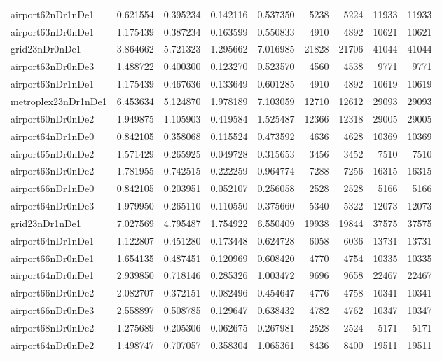 \begin{longtable}{|l|r|r|r|r|r|r|r|r|}
airport62nDr1nDe1 & 0.621554 & 0.395234 & 0.142116 & 0.537350 & 5238 & 5224 & 11933 & 11933 \\
airport63nDr0nDe1 & 1.175439 & 0.387234 & 0.163599 & 0.550833 & 4910 & 4892 & 10621 & 10621 \\
grid23nDr0nDe1 & 3.864662 & 5.721323 & 1.295662 & 7.016985 & 21828 & 21706 & 41044 & 41044 \\
airport63nDr0nDe3 & 1.488722 & 0.400300 & 0.123270 & 0.523570 & 4560 & 4538 & 9771 & 9771 \\
airport63nDr1nDe1 & 1.175439 & 0.467636 & 0.133649 & 0.601285 & 4910 & 4892 & 10619 & 10619 \\
metroplex23nDr1nDe1 & 6.453634 & 5.124870 & 1.978189 & 7.103059 & 12710 & 12612 & 29093 & 29093 \\
airport60nDr0nDe2 & 1.949875 & 1.105903 & 0.419584 & 1.525487 & 12366 & 12318 & 29005 & 29005 \\
airport64nDr1nDe0 & 0.842105 & 0.358068 & 0.115524 & 0.473592 & 4636 & 4628 & 10369 & 10369 \\
airport65nDr0nDe2 & 1.571429 & 0.265925 & 0.049728 & 0.315653 & 3456 & 3452 & 7510 & 7510 \\
airport63nDr0nDe2 & 1.781955 & 0.742515 & 0.222259 & 0.964774 & 7288 & 7256 & 16315 & 16315 \\
airport66nDr1nDe0 & 0.842105 & 0.203951 & 0.052107 & 0.256058 & 2528 & 2528 & 5166 & 5166 \\
airport64nDr0nDe3 & 1.979950 & 0.265110 & 0.110550 & 0.375660 & 5340 & 5322 & 12073 & 12073 \\
grid23nDr1nDe1 & 7.027569 & 4.795487 & 1.754922 & 6.550409 & 19938 & 19844 & 37575 & 37575 \\
airport64nDr1nDe1 & 1.122807 & 0.451280 & 0.173448 & 0.624728 & 6058 & 6036 & 13731 & 13731 \\
airport66nDr0nDe1 & 1.654135 & 0.487451 & 0.120969 & 0.608420 & 4770 & 4754 & 10335 & 10335 \\
airport64nDr0nDe1 & 2.939850 & 0.718146 & 0.285326 & 1.003472 & 9696 & 9658 & 22467 & 22467 \\
airport66nDr0nDe2 & 2.082707 & 0.372151 & 0.082496 & 0.454647 & 4776 & 4758 & 10341 & 10341 \\
airport66nDr0nDe3 & 2.558897 & 0.508785 & 0.129647 & 0.638432 & 4782 & 4762 & 10347 & 10347 \\
airport68nDr0nDe2 & 1.275689 & 0.205306 & 0.062675 & 0.267981 & 2528 & 2524 & 5171 & 5171 \\
airport64nDr0nDe2 & 1.498747 & 0.707057 & 0.358304 & 1.065361 & 8436 & 8400 & 19511 & 19511 \\

\end{longtable}
